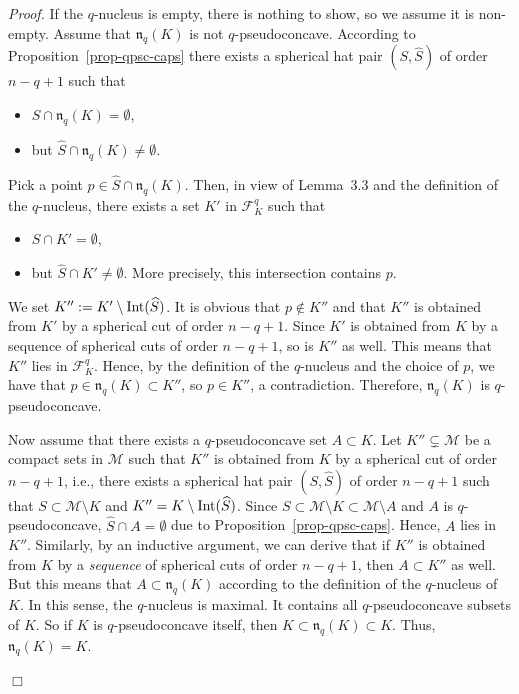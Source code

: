 \documentclass[10pt,a4paper]{amsart}
\newcommand{\Fcal}{\mathcal{F}}
\newcommand{\Int}{\hbox{Int}}
\newcommand{\Mcal}{\mathcal{M}}
\newcommand{\nuc}{\mathfrak{n}}
\newenvironment{proof}{\noindent\textit{Proof. }}{\hfill $\Box$\linebreak}
\begin{document}
\begin{proof} If the $q$-nucleus is empty, there is nothing to show, so we assume it is non-empty. Assume that $\nuc_q(K)$ is not $q$-pseudoconcave. 
According to Proposition~\ref{prop-qpsc-caps} there exists a spherical hat pair $(S,\widehat{S})$ of order $n{-}q{+}1$ such that

\begin{itemize}

\item $S \cap \nuc_q(K)=\emptyset$,

\item but $\widehat{S} \cap \nuc_q(K) \neq \emptyset$.

\end{itemize}

Pick a point $p \in \widehat{S} \cap \nuc_q(K)$. Then, in view of Lemma~3.3 and the definition of the $q$-nucleus, there exists a set $K'$ in $\Fcal_K^q$ such that

\begin{itemize}

\item $S \cap K'=\emptyset$,

\item but $\widehat{S} \cap K' \neq \emptyset$. More precisely, this intersection contains $p$.

\end{itemize}

We set $K'':= K' \setminus \Int(\widehat{S})$. It is obvious that $p \notin K''$ and that $K''$ is obtained from $K'$ by a spherical cut of order $n{-}q{+}1$. Since $K'$ is obtained from $K$ by a sequence of spherical cuts of order $n{-}q{+}1$, so is $K''$ as well. This means that $K''$ lies in $\Fcal_K^q$. Hence, by the definition of the $q$-nucleus and the choice of $p$, we have that $p \in \nuc_q(K) \subset K''$, so $p \in K''$, a contradiction. Therefore, $\nuc_q(K)$ is $q$-pseudoconcave.

Now assume that there exists a $q$-pseudoconcave set $A \subset K$. Let $K''\subsetneq\Mcal$ be a compact sets in $\Mcal$ such that $K''$ is obtained from $K$ by a spherical cut of order $n{-}q{+}1$, i.e., there exists a spherical hat pair $(S,\widehat{S})$ of order $n{-}q{+}1$ such that $S \subset \Mcal\setminus K$ and $K''=K \setminus \Int(\widehat{S})$. Since $S \subset \Mcal\setminus K \subset \Mcal\setminus A$ and $A$ is $q$-pseudoconcave, $\widehat{S} \cap A = \emptyset$ due to Proposition~\ref{prop-qpsc-caps}. Hence, $A$ lies in $K''$. Similarly, by an inductive argument, we can derive that if $K''$ is obtained from $K$ by a \emph{sequence} of spherical cuts of order $n{-}q{+}1$, then $A \subset K''$ as well. But this means that $A \subset \nuc_q(K)$ according to the definition of the $q$-nucleus of $K$. In this sense, the $q$-nucleus is maximal. It contains all $q$-pseudoconcave subsets of $K$. So if $K$ is $q$-pseudoconcave itself, then $K \subset \nuc_q(K) \subset K$. Thus, $\nuc_q(K)=K$.

\end{proof}
\end{document}

